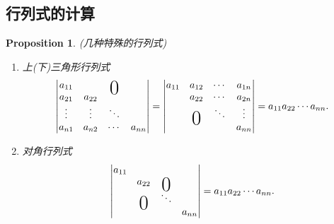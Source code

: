 \documentclass{article}
\newtheorem{proposition}[theorem]{Proposition}
\newcommand\bigzero{\makebox(0,0){\text{\huge0}}} %
\begin{document}
\subsection{行列式的计算}
\begin{proposition}
\rm {\color{red} (几种特殊的行列式)}
\begin{enumerate}
	\item {\color{red}上(下)三角形行列式}
	$$
	\begin{vmatrix}
	a_{11} & & \bigzero\\
	a_{21} & a_{22} \\
	\vdots & \vdots & \ddots \\
	a_{n1} & a_{n2} & \cdots & a_{nn}
	\end{vmatrix} =
	\begin{vmatrix}
	a_{11} & a_{12} & \cdots & a_{1n}\\
	&	a_{22} & \cdots & a_{2n} \\
	&\bigzero& \ddots & \vdots \\
	&&& a_{nn} \\
	\end{vmatrix} = a_{11}a_{22}\cdots a_{nn}.
	$$
	\item {\color{red}对角行列式}
	$$
	\begin{vmatrix}
	a_{11} &&& \\
	&a_{22} &\bigzero& \\
	&\bigzero&\ddots& \\
	&&&a_{nn}
	\end{vmatrix} = a_{11}a_{22}\cdots a_{nn}.
	$$
\end{enumerate}
\end{proposition}
\end{document}

